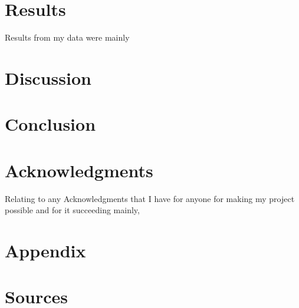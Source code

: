 \documentclass[]{article}
\begin{document}
\section{Results}
Results from my data were mainly 
\section{Discussion}

\section{Conclusion}

\section{Acknowledgments}
Relating to any Acknowledgments that I have for anyone for making my project possible and for it succeeding mainly,  
\section{Appendix}

\section{Sources}
\end{document}
